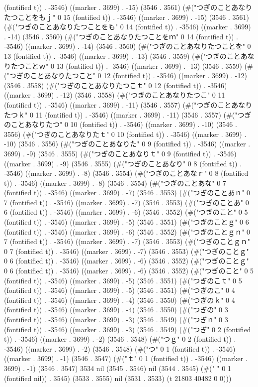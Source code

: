 (fontified t)) . -3546) ((marker . 3699) . -15) (3546 . 3561) (#("つぎのことあなりたつことをもｊ" 0 15 (fontified t)) . -3546) ((marker . 3699) . -15) (3546 . 3561) (#("つぎのことあなりたつことをも" 0 14 (fontified t)) . -3546) ((marker . 3699) . -14) (3546 . 3560) (#("つぎのことあなりたつことをｍ" 0 14 (fontified t)) . -3546) ((marker . 3699) . -14) (3546 . 3560) (#("つぎのことあなりたつことを" 0 13 (fontified t)) . -3546) ((marker . 3699) . -13) (3546 . 3559) (#("つぎのことあなりたつことｗ" 0 13 (fontified t)) . -3546) ((marker . 3699) . -13) (3546 . 3559) (#("つぎのことあなりたつこと" 0 12 (fontified t)) . -3546) ((marker . 3699) . -12) (3546 . 3558) (#("つぎのことあなりたつこｔ" 0 12 (fontified t)) . -3546) ((marker . 3699) . -12) (3546 . 3558) (#("つぎのことあなりたつこ" 0 11 (fontified t)) . -3546) ((marker . 3699) . -11) (3546 . 3557) (#("つぎのことあなりたつｋ" 0 11 (fontified t)) . -3546) ((marker . 3699) . -11) (3546 . 3557) (#("つぎのことあなりたつ" 0 10 (fontified t)) . -3546) ((marker . 3699) . -10) (3546 . 3556) (#("つぎのことあなりたｔ" 0 10 (fontified t)) . -3546) ((marker . 3699) . -10) (3546 . 3556) (#("つぎのことあなりた" 0 9 (fontified t)) . -3546) ((marker . 3699) . -9) (3546 . 3555) (#("つぎのことあなりｔ" 0 9 (fontified t)) . -3546) ((marker . 3699) . -9) (3546 . 3555) (#("つぎのことあなり" 0 8 (fontified t)) . -3546) ((marker . 3699) . -8) (3546 . 3554) (#("つぎのことあなｒ" 0 8 (fontified t)) . -3546) ((marker . 3699) . -8) (3546 . 3554) (#("つぎのことあな" 0 7 (fontified t)) . -3546) ((marker . 3699) . -7) (3546 . 3553) (#("つぎのことあｎ" 0 7 (fontified t)) . -3546) ((marker . 3699) . -7) (3546 . 3553) (#("つぎのことあ" 0 6 (fontified t)) . -3546) ((marker . 3699) . -6) (3546 . 3552) (#("つぎのこと" 0 5 (fontified t)) . -3546) ((marker . 3699) . -5) (3546 . 3551) (#("つぎのことｇ" 0 6 (fontified t)) . -3546) ((marker . 3699) . -6) (3546 . 3552) (#("つぎのことｇｎ" 0 7 (fontified t)) . -3546) ((marker . 3699) . -7) (3546 . 3553) (#("つぎのことｇｎ" 0 7 (fontified t)) . -3546) ((marker . 3699) . -7) (3546 . 3553) (#("つぎのことｇ" 0 6 (fontified t)) . -3546) ((marker . 3699) . -6) (3546 . 3552) (#("つぎのことｇ" 0 6 (fontified t)) . -3546) ((marker . 3699) . -6) (3546 . 3552) (#("つぎのこと" 0 5 (fontified t)) . -3546) ((marker . 3699) . -5) (3546 . 3551) (#("つぎのこｔ" 0 5 (fontified t)) . -3546) ((marker . 3699) . -5) (3546 . 3551) (#("つぎのこ" 0 4 (fontified t)) . -3546) ((marker . 3699) . -4) (3546 . 3550) (#("つぎのｋ" 0 4 (fontified t)) . -3546) ((marker . 3699) . -4) (3546 . 3550) (#("つぎの" 0 3 (fontified t)) . -3546) ((marker . 3699) . -3) (3546 . 3549) (#("つぎｎ" 0 3 (fontified t)) . -3546) ((marker . 3699) . -3) (3546 . 3549) (#("つぎ" 0 2 (fontified t)) . -3546) ((marker . 3699) . -2) (3546 . 3548) (#("つｇ" 0 2 (fontified t)) . -3546) ((marker . 3699) . -2) (3546 . 3548) (#("つ" 0 1 (fontified t)) . -3546) ((marker . 3699) . -1) (3546 . 3547) (#("ｔ" 0 1 (fontified t)) . -3546) ((marker . 3699) . -1) (3546 . 3547) 3534 nil (3545 . 3546) nil (3544 . 3545) (#(" " 0 1 (fontified nil)) . 3545) (3533 . 3555) nil (3531 . 3533) (t 21803 40482 0 0)))
